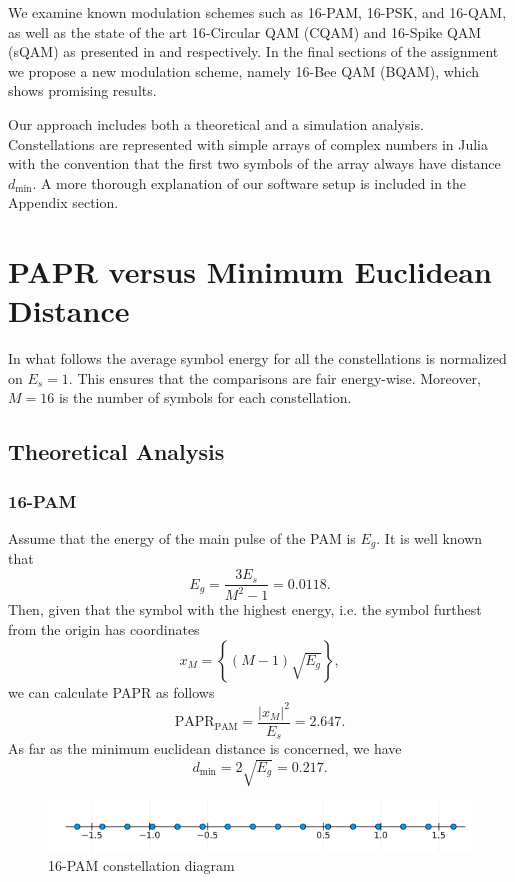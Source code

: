 \documentclass[11pt,a4paper,onecolumn,final]{article}
\begin{document}
We examine known modulation schemes such as 16-PAM, 16-PSK, and 16-QAM, as well as the state of the art 16-Circular QAM (CQAM) and 16-Spike QAM (sQAM) as presented in \cite{cqam} and \cite{sqam} respectively. In the final sections of the assignment we propose a new modulation scheme, namely 16-Bee QAM (BQAM), which shows promising results. 

Our approach includes both a theoretical and a simulation analysis. Constellations are represented with simple arrays of complex numbers in Julia with the convention that the first two symbols of the array always have distance \(d_\text{min}\). A more thorough explanation of our software setup is included in the Appendix section.  


\section{PAPR versus Minimum Euclidean Distance}
In what follows the average symbol energy for all the constellations is normalized on \(E_s = 1\). This ensures that the comparisons are fair energy-wise. Moreover, \(M = 16\) is the number of symbols for each constellation. 

\subsection{Theoretical Analysis}
\subsubsection*{16-PAM} 
Assume that the energy of the main pulse of the PAM is \(E_g\). It is well known that 
\begin{equation}
    E_g = \frac{3E_s }{M^2 - 1} = 0.0118. 
\end{equation}
Then, given that the symbol with the highest energy, i.e. the symbol furthest from the origin has coordinates 
\begin{equation}
    x_M = \left\{(M-1)\sqrt{E_g}\right\}, 
\end{equation}
we can calculate PAPR as follows 
\begin{equation}
    \text{PAPR}_\text{PAM} = \frac{|x_M|^2}{E_s} = 2.647.
\end{equation}
As far as the minimum euclidean distance is concerned, we have
\begin{equation}
    d_\text{min} = 2\sqrt{E_g} = 0.217.
\end{equation}

\begin{figure}[h]
    \centering
    \includegraphics[scale=0.7]{16pam.png}
    \caption{16-PAM constellation diagram}
\end{figure}
\end{document}
